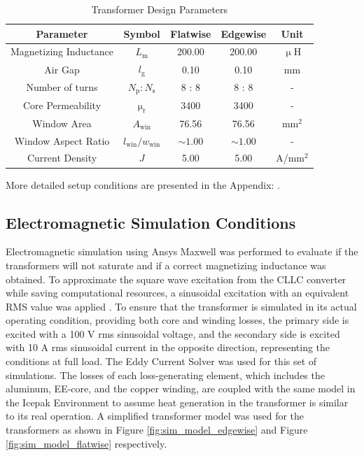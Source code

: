 \begin{table}[htbp]
    \caption{Transformer Design Parameters}
    \centering
    
        \begin{tabular}{ccccc}
            \hline
            \textbf{Parameter} & \textbf{Symbol} & \textbf{Flatwise} & \textbf{Edgewise} & \textbf{Unit} \\
            \hline \hline
            Magnetizing Inductance & $L_\mathrm{m}$ & 200.00 & 200.00 & $\upmu$H \\
            Air Gap & $l_\mathrm{g}$ & 0.10 & 0.10 & mm \\
            Number of turns & $N_\mathrm{p} : N_\mathrm{s}$ & 8 : 8 & 8 : 8 & - \\
            Core Permeability & $\upmu_\mathrm{r}$ & 3400 & 3400 & - \\
            Window Area & $A_{\mathrm{win}}$ & 76.56 & 76.56 & mm$^2$ \\
            Window Aspect Ratio & $l_{\mathrm{win}} / w_{\mathrm{win}}$ & $\sim 1.00$ & $\sim 1.00$ & - \\
            Current Density & $J$ & 5.00 & 5.00 & A/mm$^2$ \\
            \hline
        \end{tabular}%
    
    \label{tab:design_params}
\end{table}

More detailed setup conditions are presented in the Appendix: .
\subsection{Electromagnetic Simulation Conditions}\label{electromagneticsim}
Electromagnetic simulation using Ansys Maxwell was performed to evaluate if the transformers will not saturate and if a correct magnetizing inductance was obtained. To approximate the square wave excitation from the CLLC converter while saving computational resources, a sinusoidal excitation with an equivalent RMS value was applied \cite{ref21}. To ensure that the transformer is simulated in its actual operating condition, providing both core and winding losses, the primary side is excited with a 100 V rms sinusoidal voltage, and the secondary side is excited with 10 A rms sinusoidal current in the opposite direction, representing the conditions at full load. The Eddy Current Solver was used for this set of simulations. The losses of each loss-generating element, which includes the aluminum, EE-core, and the copper winding, are coupled with the same model in the Icepak Environment to assume heat generation in the transformer is similar to its real operation. A simplified transformer model was used for the transformers as shown in Figure \ref{fig:sim_model_edgewise} and Figure \ref{fig:sim_model_flatwise} respectively.

